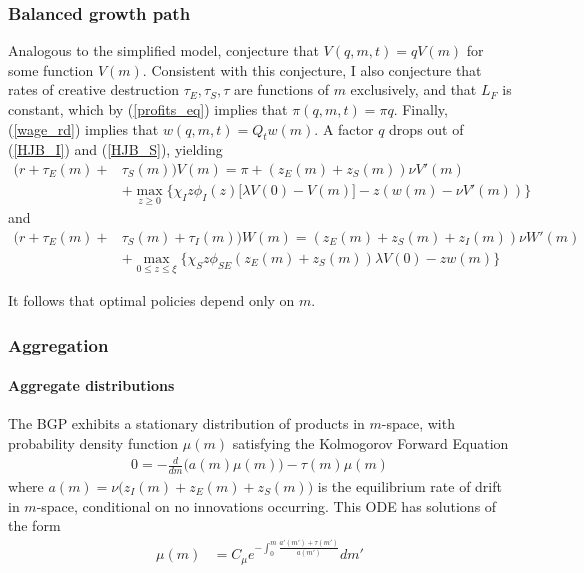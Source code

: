 \documentclass[12pt,english]{article}
\theoremstyle{remark}
\begin{document}
\subsubsection{Balanced growth path}

Analogous to the simplified model, conjecture that $V(q,m,t) = q V(m)$ for some function $V(m)$. Consistent with this conjecture, I also conjecture that rates of creative destruction $\tau_E,\tau_S,\tau$ are functions of $m$ exclusively, and that $L_F$ is constant, which by (\ref{profits_eq}) implies that $\pi(q,m,t) = \pi q$. Finally, (\ref{wage_rd}) implies that $w(q,m,t) = Q_t w(m)$. A factor $q$ drops out of (\ref{HJB_I}) and (\ref{HJB_S}), yielding
\begin{align}
(r + \tau_E(m) + &\tau_S(m)) V(m) = \pi + (z_E(m) + z_S(m))\nu V'(m) \nonumber \\
       &+ \max_{z \ge 0} \Big\{  \chi_I z \phi_I(z) \Big[\lambda V(0) - V(m) \Big] - z (w(m) - \nu V'(m)  ) \Big\} \label{BGP_HJB_I}
\end{align} 
and
\begin{align}
(r + \tau_E(m) + &\tau_S(m) + \tau_I(m))W(m) = (z_E(m) + z_S(m) + z_I(m)) \nu W'(m) \nonumber \\
		&+ \max_{0 \le z \le \xi} \Big\{  \chi_S z \phi_{SE}(z_E(m) + z_S(m)) \lambda V(0) - z w(m) \Big\} \label{BGP_HJB_S} 
\end{align}

It follows that optimal policies depend only on $m$. 

\subsubsection{Aggregation}\label{full_model_aggregation}

\paragraph{Aggregate distributions} The BGP exhibits a stationary distribution of products in $m$-space, with probability density function $\mu(m)$ satisfying the Kolmogorov Forward Equation
\begin{align}
	0 = - \frac{d}{dm} \Big( a(m) \mu(m) \Big) - \tau(m) \mu(m)  \label{KF_equation}
\end{align}
where $a(m) = \nu \Big( z_I(m) + z_E(m) + z_S(m)\Big)$ is the equilibrium rate of drift in $m$-space, conditional on no innovations occurring. This ODE has solutions of the form
\begin{align}
	\mu(m) &= C_\mu e^{-\int_0^m \frac{a'(m') + \tau(m')}{a(m')}} dm' \label{KF_solution_1}
\end{align}
\end{document}
